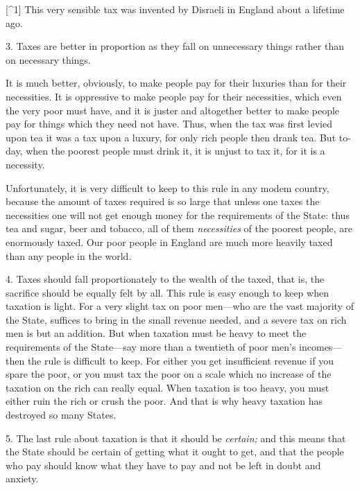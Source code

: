 \documentclass{book}
\begin{document}
{[}\textasciicircum{}1{]} This very sensible tax was invented by Disraeli in England about a lifetime ago.

3. Taxes are better in proportion as they fall on unnecessary things rather than on necessary things.

It is much better, obviously, to make people pay for their luxuries than for their necessities. It is oppressive to make people pay for their necessities, which even the very poor must have, and it is juster and altogether better to make people pay for things which they need not have. Thus, when the tax was first levied upon tea it was a tax upon a luxury, for only rich people then drank tea. But to-day, when the poorest people must drink it, it is unjust to tax it, for it is a necessity.

Unfortunately, it is very difficult to keep to this rule in any modem country, because the amount of taxes required is so large that unless one taxes the necessities one will not get enough money for the requirements of the State: thus tea and sugar, beer and tobacco, all of them \emph{necessities} of the poorest people, are enormously taxed. Our poor people in England are much more heavily taxed than any people in the world.

4. Taxes should fall proportionately to the wealth of the taxed, that is, the sacrifice should be equally felt by all. This rule is easy enough to keep when taxation is light. For a very slight tax on poor men—who are the vast majority of the State, suffices to bring in the small revenue needed, and a severe tax on rich men is but an addition. But when taxation must be heavy to meet the requirements of the State—say more than a twentieth of poor men’s incomes—then the rule is difficult to keep. For either you get insufficient revenue if you spare the poor, or you must tax the poor on a scale which no increase of the taxation on the rich can really equal. When taxation is too heavy, you must either ruin the rich or crush the poor. And that is why heavy taxation has destroyed so many States.

5. The last rule about taxation is that it should be \emph{certain;} and this means that the State should be certain of getting what it ought to get, and that the people who pay should know what they have to pay and not be left in doubt and anxiety.
\end{document}
